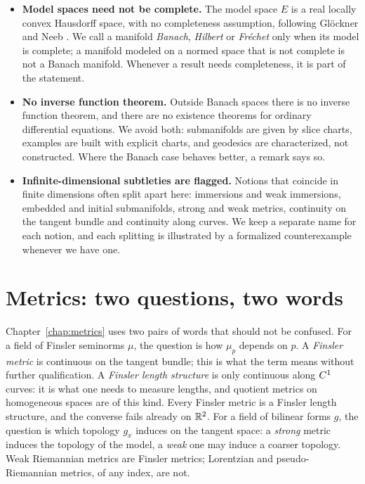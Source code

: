 \begin{itemize}
  \item \textbf{Model spaces need not be complete.} The model space $E$ is a real locally convex
  Hausdorff space, with no completeness assumption, following Glöckner and Neeb \cite{GN26}. We
  call a manifold \emph{Banach}, \emph{Hilbert} or \emph{Fréchet} only when its model is complete;
  a manifold modeled on a normed space that is not complete is not a Banach manifold. Whenever a
  result needs completeness, it is part of the statement.

  \item \textbf{No inverse function theorem.} Outside Banach spaces there is no inverse function
  theorem, and there are no existence theorems for ordinary differential equations. We avoid both:
  submanifolds are given by slice charts, examples are built with explicit charts, and geodesics
  are characterized, not constructed. Where the Banach case behaves better, a remark says so.

  \item \textbf{Infinite-dimensional subtleties are flagged.} Notions that coincide in finite
  dimensions often split apart here: immersions and weak immersions, embedded and initial
  submanifolds, strong and weak metrics, continuity on the tangent bundle and continuity along
  curves. We keep a separate name for each notion, and each splitting is illustrated by a
  formalized counterexample whenever we have one.
\end{itemize}

\section*{Metrics: two questions, two words}

Chapter~\ref{chap:metrics} uses two pairs of words that should not be confused. For a field of
Finsler seminorms $\mu$, the question is how $\mu_p$ depends on $p$. A \emph{Finsler metric} is
continuous on the tangent bundle; this is what the term means without further qualification. A
\emph{Finsler length structure} is only continuous along $C^{1}$ curves: it is what one needs to
measure lengths, and quotient metrics on homogeneous spaces are of this kind. Every Finsler metric
is a Finsler length structure, and the converse fails already on $\mathbb{R}^2$. For a field of bilinear
forms $g$, the question is which topology $g_x$ induces on the tangent space: a \emph{strong}
metric induces the topology of the model, a \emph{weak} one may induce a coarser topology. Weak
Riemannian metrics are Finsler metrics; Lorentzian and pseudo-Riemannian metrics, of any index, are
not.

